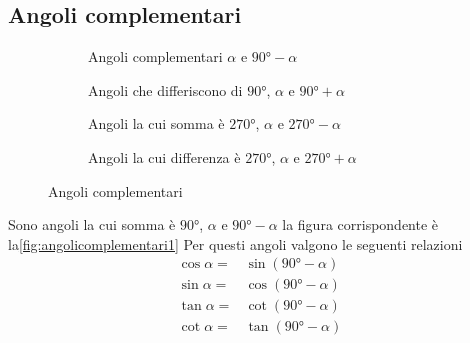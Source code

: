 \subsection{Angoli complementari}
\label{sub:AngoliComp}
\begin{figure}
	\begin{subfigure}[b]{.49\linewidth}
 	\centering
 	
 	\caption{Angoli complementari $\alpha$ e $\ang{90}-\alpha$}\label{fig:angolicomplementari1}
 \end{subfigure}
 	\begin{subfigure}[b]{.49\linewidth}
 		\centering
 		
 		\caption{Angoli che differiscono di $\ang{90}$, $\alpha$ e $\ang{90}+\alpha$}\label{fig:angolicomplementari2}
 	\end{subfigure}
 \begin{subfigure}[b]{.49\linewidth}
 		\centering
 		
 		\caption{Angoli la cui somma è $\ang{270}$, $\alpha$ e $\ang{270}-\alpha$}\label{tab:angolicomplementari3}	
 	\end{subfigure}
	\begin{subfigure}[b]{.49\linewidth}
		\centering
		
		\caption{Angoli la cui differenza è $\ang{270}$, $\alpha$ e $\ang{270}+\alpha$}\label{tab:angolicomplementari4}	
	\end{subfigure}
	\caption{Angoli complementari}
	\label{fig:angolicomplementari}
\end{figure}
Sono angoli la cui somma è $\ang{90}$, $\alpha$ e $\ang{90}-\alpha$ la figura corrispondente è la\nobs\vref{fig:angolicomplementari1}
%	
Per questi angoli valgono le seguenti relazioni
\begin{align*}
\cos\alpha=&{}\sin(\ang{90}-\alpha)\\
\sin\alpha=&{}\cos(\ang{90}-\alpha)\\
\tan\alpha=&{}\cot(\ang{90}-\alpha)\\
\cot\alpha=&{}\tan(\ang{90}-\alpha)
\end{align*}
